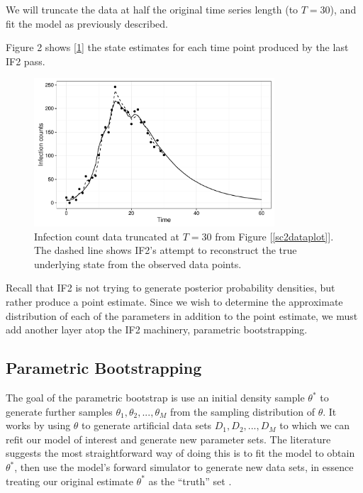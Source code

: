 	We will truncate the data at half the original time series length (to $T = 30$), and fit the model as previously described.

	Figure 2 shows [\ref{if2fit}] the state estimates for each time point produced by the last IF2 pass.

	\begin{figure}
        \centering
        \captionsetup{width=.8\linewidth}
        \includegraphics[width=0.8\textwidth]{./images/if2fit.pdf}
        \caption{Infection count data truncated at $T = 30$ from Figure [\ref{sc2dataplot}]. The dashed line shows IF2's attempt to reconstruct the true underlying state from the observed data points. \label{if2fit}}
    \end{figure}

    Recall that IF2 is not trying to generate posterior probability densities, but rather produce a point estimate. Since we wish to determine the approximate distribution of each of the parameters in addition to the point estimate, we must add another layer atop the IF2 machinery, parametric bootstrapping.


\subsection{Parametric Bootstrapping}

	The goal of the parametric bootstrap is use an initial density sample $\theta^*$ to generate further samples $\theta_1, \theta_2, ..., \theta_M$ from the sampling distribution of $\theta$. It works by using $\theta$ to generate artificial data sets $D_1, D_2, ..., D_M$ to which we can refit our model of interest and generate new parameter sets. The literature suggests the most straightforward way of doing this is to fit the model to obtain $\theta^*$, then use the model's forward simulator to generate new data sets, in essence treating our original estimate $\theta^*$ as the ``truth'' set \cite{Genest2008}.


